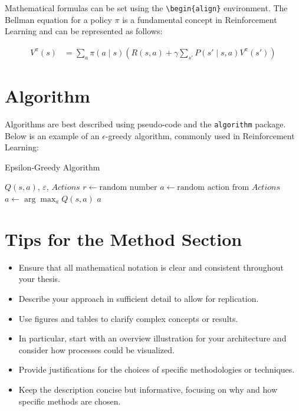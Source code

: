 Mathematical formulas can be set using the \verb+\begin{align}+ environment. The Bellman equation for a policy \(\pi\) is a fundamental concept in Reinforcement Learning and can be represented as follows:

\begin{align}
V^\pi(s) &= \sum_{a} \pi(a \mid s) \left( R(s,a) + \gamma \sum_{s'} P(s' \mid s,a) V^\pi(s') \right) \label{eq:bellman_policy}
\end{align}

\section{Algorithm}
\label{s:algorithm}

Algorithms are best described using pseudo-code and the \verb+algorithm+ package. Below is an example of an $\epsilon$-greedy algorithm, commonly used in Reinforcement Learning:

\begin{algorithm}
\caption{Epsilon-Greedy Algorithm}
\label{alg:epsilon_greedy}
\begin{algorithmic}
\REQUIRE $Q(s, a)$, $\varepsilon$, $Actions$
\STATE $r \gets \text{random number}$
    \STATE $a \gets \text{random action from } Actions$
\ELSE
    \STATE $a \gets \arg\max_a Q(s, a)$
\ENDIF
\RETURN $a$
\end{algorithmic}
\end{algorithm}

\clearpage

\section{Tips for the Method Section}
\begin{itemize}
    \item Ensure that all mathematical notation is clear and consistent throughout your thesis.
    \item Describe your approach in sufficient detail to allow for replication.
    \item Use figures and tables to clarify complex concepts or results.
    \item In particular, start with an overview illustration for your architecture and consider how processes could be visualized.
    \item Provide justifications for the choices of specific methodologies or techniques.
    \item Keep the description concise but informative, focusing on why and how specific methods are chosen.
\end{itemize}

